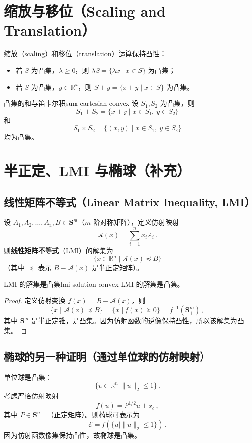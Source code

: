 \documentclass[11pt,a4paper]{article}
\begin{document}
\section{缩放与移位（Scaling and Translation）}

缩放（scaling）和移位（translation）运算保持凸性：

\begin{itemize}
\item 若 $S$ 为凸集，$\lambda \geq 0$，则 $\lambda S = \{\lambda x \mid x \in S\}$ 为凸集；
\item 若 $S$ 为凸集，$y \in \mathbb{R}^n$，则 $S + y = \{x + y \mid x \in S\}$ 为凸集。
\end{itemize}

\begin{example}{凸集的和与笛卡尔积}{sum-cartesian-convex}
设 $S_1, S_2$ 为凸集，则
\[
S_1 + S_2 = \{ x + y \mid x \in S_1,\ y \in S_2 \}
\]
和
\[
S_1 \times S_2 = \{ (x,y) \mid x \in S_1,\ y \in S_2 \}
\]
均为凸集。
\end{example}

\section{半正定、LMI 与椭球（补充）}

\subsection{线性矩阵不等式（Linear Matrix Inequality, LMI）}
设 $A_1, A_2, \dots, A_n, B \in \mathbf{S}^m$（$m$ 阶对称矩阵），定义仿射映射
\[
\mathcal{A}(x) = \sum_{i=1}^n x_i A_i\,.
\]
则\textbf{线性矩阵不等式}（LMI）的解集为
\[
\{ x \in \mathbb{R}^n \mid \mathcal{A}(x) \preceq B \}
\]
（其中 $\preceq$ 表示 $B - \mathcal{A}(x)$ 是半正定矩阵）。

\begin{theorem}{LMI 的解集是凸集}{lmi-solution-convex}
LMI 的解集是凸集。
\end{theorem}

\begin{proof}
定义仿射变换 $f(x) = B - \mathcal{A}(x)$，则
\[
\{ x \mid \mathcal{A}(x) \preceq B \} = \{ x \mid f(x) \succeq 0 \} = f^{-1}(\mathbf{S}_+^m)\,,
\]
其中 $\mathbf{S}_+^m$ 是半正定锥，是凸集。因为仿射函数的逆像保持凸性，所以该解集为凸集。
\end{proof}

\subsection{椭球的另一种证明（通过单位球的仿射映射）}
单位球是凸集：
\[
\{ u \in \mathbb{R}^n \mid \|u\|_2 \leq 1 \}\,.
\]
考虑严格仿射映射
\[
f(u) = P^{1/2} u + x_c\,,
\]
其中 $P \in \mathbf{S}_{++}^n$（正定矩阵）。则椭球可表示为
\[
\mathcal{E} = f(\{ u \mid \|u\|_2 \leq 1 \})\,.
\]
因为仿射函数像集保持凸性，故椭球是凸集。
\end{document}
